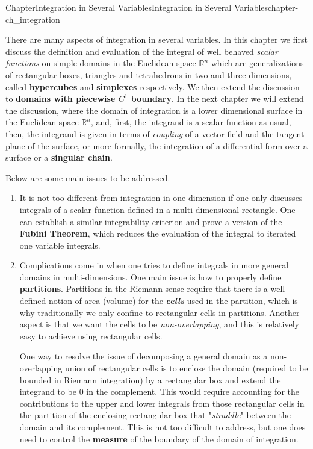 \documentclass[oneside,10pt,]{book}
\newcommand{\alert}[1]{\textbf{\textit{#1}}}
\newcommand{\terminology}[1]{\textbf{#1}}
\numberwithin{equation}{section}
\newcommand{\bbR}{\mathbb{R}}
\begin{document}
%
%
\typeout{************************************************}
\typeout{************************************************}
%
\begin{chapterptx}{Chapter}{Integration in Several Variables}{}{Integration in Several Variables}{}{}{chapter-ch_integration}
\renewcommand*{\chaptername}{Chapter}
\begin{introduction}{}%
There are many aspects of integration in several variables. In this chapter we  first discuss the definition and evaluation of the integral of well behaved \emph{scalar functions}  on simple domains in the Euclidean space \(\bbR^{n}\) which are generalizations of rectangular boxes, triangles and tetrahedrons in two and three dimensions, called \terminology{hypercubes} and \terminology{simplexes} respectively. We then extend the discussion to \terminology{domains with piecewise \(C^{1}\) boundary}. In the next chapter we will extend the discussion, where the domain of integration is a lower dimensional surface in the Euclidean space \(\bbR^{n}\), and, first, the integrand is a scalar function as usual, then, the integrand is given in terms of \emph{coupling} of a vector field and the tangent plane of the surface, or more formally, the integration of a differential form over a surface or a \terminology{singular chain}.%
\par
Below are some main issues to be addressed.%
%
\begin{enumerate}
\item{}It is not too different from integration in one dimension if one only discusses integrals of a scalar function defined in a multi-dimensional rectangle. One can establish a similar integrability criterion and prove a version of the \terminology{Fubini Theorem}, which reduces the evaluation of the integral to iterated one variable integrals.%
\item{}Complications come in when one tries to define integrals in more general domains in multi-dimensions. One main issue is how to properly define \terminology{partitions}. Partitions in the Riemann sense require that there is a well defined notion of area (volume) for the \alert{cells} used in the partition, which is why traditionally we only confine to rectangular cells in partitions. Another aspect is that we want the cells to be \emph{non-overlapping}, and this is relatively easy to achieve using rectangular cells.%
\par
One way to resolve the issue of decomposing a general domain as a non-overlapping union of rectangular cells is to enclose the domain (required to be bounded in Riemann integration) by a rectangular box and extend the integrand to be \(0\) in the complement. This would require accounting for the contributions to the upper and lower integrals from  those rectangular cells in the partition of the enclosing rectangular box that "\emph{straddle}" between the domain and its complement. This is not too difficult to address, but one does need to control the \terminology{measure} of the boundary of the domain of integration.%

\end{enumerate}
\end{introduction}
\end{chapterptx}
\end{document}
